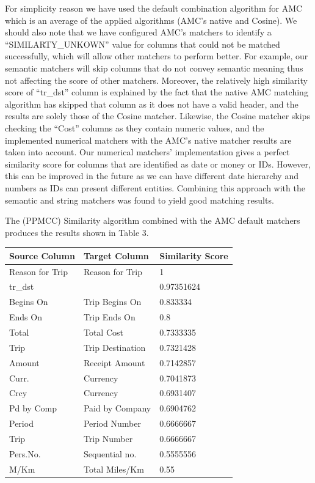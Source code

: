 \documentclass{sig-alternate}
\begin{document}
For simplicity reason we have used the default combination algorithm for AMC which is an average of the applied algorithms (AMC's native and Cosine). We should also note that we have configured AMC's matchers to identify a ``SIMILARTY\_UNKOWN'' value for columns that could not be matched successfully, which will allow other matchers to perform better. For example, our semantic matchers will skip columns that do not convey semantic meaning thus not affecting the score of other matchers. Moreover, the relatively high similarity score of ``tr\_dst'' column is explained by the fact that the native AMC matching algorithm has skipped that column as it does not have a valid header, and the results are solely those of the Cosine matcher. Likewise, the Cosine matcher skips checking the ``Cost'' columns as they contain numeric values, and the implemented numerical matchers with the AMC's native matcher results are taken into account. Our numerical matchers' implementation gives a perfect similarity score for columns that are identified as date or money or IDs. However, this can be improved in the future as we can have different date hierarchy and numbers as IDs can present different entities. Combining this approach with the semantic and string matchers was found to yield good matching results. 

The (PPMCC) Similarity algorithm combined with the AMC default matchers produces the results shown in Table 3.

\begin{tabular}{|p{0.7in}|p{0.8in}|p{0.8in}|} \hline 
\textbf{Source Column} & \textbf{Target Column} & \textbf{Similarity Score} \\ \hline 
Reason for Trip & Reason for Trip & 1 \\ \hline 
tr\_dst &  & 0.97351624 \\ \hline 
Begins On & Trip Begins On & 0.833334 \\ \hline 
Ends On & Trip Ends On & 0.8 \\ \hline 
Total & Total Cost & 0.7333335 \\ \hline 
Trip & Trip Destination & 0.7321428 \\ \hline 
Amount & Receipt Amount & 0.7142857 \\ \hline 
Curr. & Currency & 0.7041873 \\ \hline 
Crcy & Currency & 0.6931407 \\ \hline 
Pd by Comp & Paid by Company & 0.6904762 \\ \hline 
Period & Period Number & 0.6666667 \\ \hline 
Trip & Trip Number & 0.6666667 \\ \hline 
Pers.No. & Sequential no. & 0.5555556 \\ \hline 
M/Km & Total Miles/Km & 0.55 \\ \hline 
\end{tabular}
\end{document}
